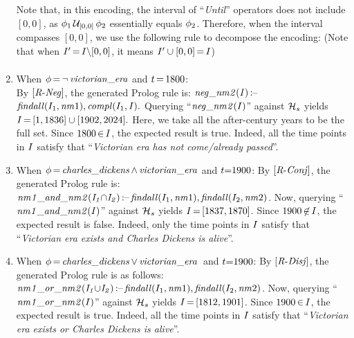\begin{enumerate}[itemsep=0.7em,leftmargin=!,wide]
Note that, in this encoding, the interval of ``\emph{Until}'' operators does not include $[0, 0]$, as $\phi_1  
\,\mathcal{U}_{[0, 0]} \,  \phi_2$ essentially equals $\phi_2$. Therefore, when the interval compasses $[0, 0]$, we use the following rule to decompose the encoding: (Note that when $I'\,{=}\,I{\setminus}[0, 0]$, it means $I'\cup[0, 0]\,{=}\,I$)
\begin{align*}

\end{align*}

\vspace{2mm}
\item When $\phi\,{=}\,\neg\,\mathit{victorian\_era}$ and $t\,{=}\,1800$: \\
By $[\mathit{R}\text{-}\mathit{Neg}]$, the generated Prolog rule is: 
$\mathit{neg\_\mathit{nm}2(I)}\,\text{:--}\,$ 
$\mathit{findall}(I_1, \mathit{nm}1), \mathit{compl}(I_1, I).$ 
Querying ``$\mathit{neg\_\mathit{nm}2}(I)$'' against $\mathcal{H}_s$ yields $I\,{=}\,[1, 1836] \cup [1902, 2024].$
Here, we take all the after-century years to be the full set. 
Since $1800\,{\in}\,I$, the expected result is true. 
Indeed, all the time points in $I$ satisfy that ``\emph{Victorian era has not come/already passed}''.  


\item When $\phi\,{=}\,\mathit{charles\_dickens}\,{\wedge}\,\mathit{victorian\_era}$ and $t{=}1900$: 
By $[\mathit{R}\text{-}\mathit{Conj}]$, the generated Prolog rule is: 
$\mathit{\mathit{nm}1\_and\_\mathit{nm}2(I_1{\cap}I_2)}\,\text{:--}\, 
\mathit{findall}(I_1, \mathit{nm}1), \mathit{findall}(I_2, \mathit{nm}2)$. 
Now, querying ``$\mathit{\mathit{nm}1\_and\_\mathit{nm}2}(I)$'' against $\mathcal{H}_s$ yields $I\,{=}\,[1837, 1870]$. Since $1900\,{\not\in}\,I$, the expected result is false. 
Indeed, only the time points in $I$ satisfy that ``\emph{Victorian era exists and Charles Dickens is alive}''. 


\item When $\phi\,{=}\,\mathit{charles\_dickens}\,{\vee}\,\mathit{victorian\_era}$~and
$t{=}1900$: 
By $[\mathit{R}\text{-}\mathit{Disj}]$, the generated Prolog rule is as follows: 
$\mathit{\mathit{nm}1\_or\_\mathit{nm}2(I_1{\cup}I_2)}\,\text{:--}\, 
\mathit{findall}(I_1, \mathit{nm}1), \mathit{findall}(I_2, \mathit{nm}2)$. 
Now, querying ``$\mathit{\mathit{nm}1\_or\_\mathit{nm}2}(I)$'' against $\mathcal{H}_s$ yields $I\,{=}\,[1812, 1901]$. Since $1900\,{\in}\,I$, the expected result is true. 
Indeed, all the time points in $I$ satisfy that ``\emph{Victorian era exists or Charles Dickens is alive}''.  
\end{enumerate}
\vspace{3mm}






